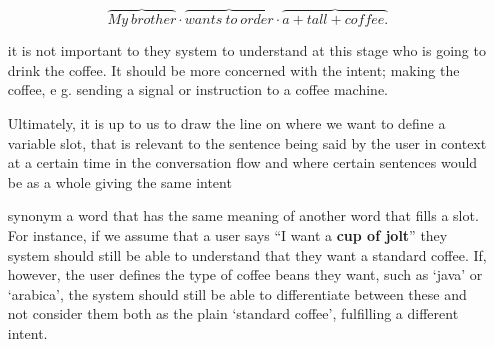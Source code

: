 \begin{itemize}
	\[
	\overbrace{My \ brother} \cdot
	\overbrace{wants \ to \ order} \cdot
	\overbrace{ a + tall + coffee.}
	\]
	
	it is not important to they system to understand at this stage who is going to drink the coffee. It should be more concerned with the intent; making the coffee, e g. sending a signal or instruction to a coffee machine.
	 
	Ultimately, it is up to us to draw the line on where we want to define a variable slot, that is relevant to the sentence being said by the user in context at a certain time in the conversation flow and where certain sentences would be as a whole giving the same intent
	
	
	\item[synonym] a word that has the same meaning of another word that fills a slot. For instance, if we assume that a user says ``I want a \textbf{cup of jolt}'' they system should still be able to understand that they want a standard coffee. If, however, the user defines the type of coffee beans they want, such as `java' or `arabica', the system should still be able to differentiate between these and not consider them both as the plain `standard coffee', fulfilling a different intent. 
		
\end{itemize}

